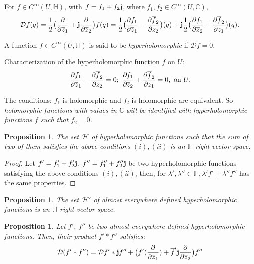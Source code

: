 \documentclass[12pt]{amsart}
\newtheorem{prop}[thm]{Proposition}
\theoremstyle{definition}
\begin{document}
For $f\in C^\infty (U,{\mathbb H})$, with $f=f_1+f_2{\bf j}$, where $f_1, f_2\in C^\infty (U,{\mathbb{C}})$, 
$$
{\mathcal D} f(q)=\frac{1}{2}\big(\frac{\partial}{\partial\overline z_1}
+{\bf j}\frac{\partial}{\partial\overline z_2}\big) f(q)=\frac{1}{2}\big({\frac{\partial
f_1}{\partial\overline z_1}-\frac{\partial\overline f_2}{\partial z_2}}\big)
(q)+{\bf j}\frac{1}{2}\big({\frac{\partial f_1}{\partial\overline
z_2}+\frac{\partial\overline f_2}{\partial z_1}}\big) (q).
$$

A function $f\in C^\infty (U,{\mathbb H})$ is said to be {\it hyperholomorphic} if ${\mathcal
D}f=0$.

Characterization of the hyperholomorphic function $f$ on $U$:
\begin{equation}\label{Eq1}
{\frac{\partial
f_1}{\partial\overline z_1}-\frac{\partial\overline f_2}{\partial z_2}}=0; \ {\displaystyle\frac{\partial f_1}{\partial\overline
z_2}+\frac{\partial\overline f_2}{\partial z_1}}=0,\ {\rm on} \ U.
\end{equation}

The conditions: $f_1$ is holomorphic and $f_2$ is holomorphic are equivalent.
So {\it holomorphic functions with values in ${\mathbb{C}}$ will be identified with hyperholomorphic functions $f$ such that $f_2=0$.}

\begin{prop}The set ${\mathcal H}$ of hyperholomorphic functions such that the sum of two of them satisfies the above conditions $(i), (ii)$ is an ${\mathbb H}$-right vector space.
\end{prop}
\begin{proof}Let $f'=f'_1+f'_2{\bf j}$, $f''=f''_1+f''_2{\bf j}$ be two hyperholomorphic functions satisfying the above conditions $(i), (ii)$, then, for $\lambda', \lambda''\in {\mathbb H}, \lambda'f'+\lambda''f''$ has the same properties. \end{proof}

\begin{prop}The set ${\mathcal H}'$ of almost everywhere defined hyperholomorphic functions is an ${\mathbb H}$-right vector space.\end{prop}

\begin{prop}\label{Proposition 2.3.2.}Let $f'$, $f''$ be two almost everywhere defined hyperholomorphic functions. Then, their product $f'*f''$ satisfies:
$$
{\mathcal D} (f'*f'')={\mathcal D}f'*{\bf j}f''+\big(f'(\frac{\partial }{\partial\overline z_1})+\overline f'{\bf j}\frac{\partial }{\partial\overline z_2}\big)f''
$$
\end{prop}
\end{document}
